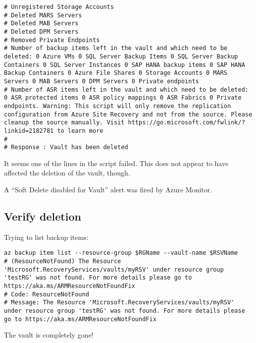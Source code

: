 \begin{verbatim}
# Unregistered Storage Accounts
# Deleted MARS Servers
# Deleted MAB Servers
# Deleted DPM Servers
# Removed Private Endpoints
# Number of backup items left in the vault and which need to be deleted: 0 Azure VMs 0 SQL Server Backup Items 0 SQL Server Backup Containers 0 SQL Server Instances 0 SAP HANA backup items 0 SAP HANA Backup Containers 0 Azure File Shares 0 Storage Accounts 0 MARS Servers 0 MAB Servers 0 DPM Servers 0 Private endpoints
# Number of ASR items left in the vault and which need to be deleted: 0 ASR protected items 0 ASR policy mappings 0 ASR Fabrics 0 Private endpoints. Warning: This script will only remove the replication configuration from Azure Site Recovery and not from the source. Please cleanup the source manually. Visit https://go.microsoft.com/fwlink/?linkid=2182781 to learn more
#
# Response : Vault has been deleted
\end{verbatim}

It seems one of the lines in the script failed.
This does not appear to have affected the deletion of the vault, though.

A ``Soft Delete disabled for Vault'' alert was fired by Azure Monitor.

\subsection{Verify deletion}
\label{sec:orgcd06d3c}
Trying to list backup items:
\begin{verbatim}
az backup item list --resource-group $RGName --vault-name $RSVName
# (ResourceNotFound) The Resource 'Microsoft.RecoveryServices/vaults/myRSV' under resource group 'testRG' was not found. For more details please go to https://aka.ms/ARMResourceNotFoundFix
# Code: ResourceNotFound
# Message: The Resource 'Microsoft.RecoveryServices/vaults/myRSV' under resource group 'testRG' was not found. For more details please go to https://aka.ms/ARMResourceNotFoundFix
\end{verbatim}

The vault is completely gone!

